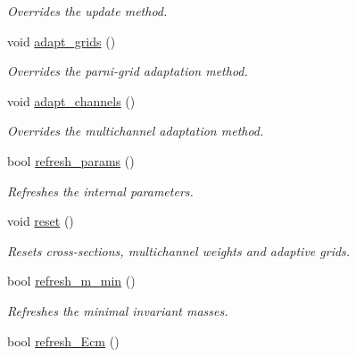 \begin{DoxyCompactItemize}
\begin{DoxyCompactList}\small\item\em Overrides the update method. \end{DoxyCompactList}\item 
\hypertarget{a00458_a5c06312d06862684d0ed0208c50c79ed}{}void \hyperlink{a00458_a5c06312d06862684d0ed0208c50c79ed}{adapt\+\_\+grids} ()\label{a00458_a5c06312d06862684d0ed0208c50c79ed}

\begin{DoxyCompactList}\small\item\em Overrides the parni-\/grid adaptation method. \end{DoxyCompactList}\item 
\hypertarget{a00458_ada36cad264a280d7a3e431ded70db380}{}void \hyperlink{a00458_ada36cad264a280d7a3e431ded70db380}{adapt\+\_\+channels} ()\label{a00458_ada36cad264a280d7a3e431ded70db380}

\begin{DoxyCompactList}\small\item\em Overrides the multichannel adaptation method. \end{DoxyCompactList}\item 
\hypertarget{a00458_a5705dfa7e9fafc6250aa4c9a46fa2817}{}bool \hyperlink{a00458_a5705dfa7e9fafc6250aa4c9a46fa2817}{refresh\+\_\+params} ()\label{a00458_a5705dfa7e9fafc6250aa4c9a46fa2817}

\begin{DoxyCompactList}\small\item\em Refreshes the internal parameters. \end{DoxyCompactList}\item 
\hypertarget{a00458_ae37d08f29d236504388d457aca77a63f}{}void \hyperlink{a00458_ae37d08f29d236504388d457aca77a63f}{reset} ()\label{a00458_ae37d08f29d236504388d457aca77a63f}

\begin{DoxyCompactList}\small\item\em Resets cross-\/sections, multichannel weights and adaptive grids. \end{DoxyCompactList}\item 
\hypertarget{a00458_a94de94ece36dbc8087f427ceb2f1846a}{}bool \hyperlink{a00458_a94de94ece36dbc8087f427ceb2f1846a}{refresh\+\_\+m\+\_\+min} ()\label{a00458_a94de94ece36dbc8087f427ceb2f1846a}

\begin{DoxyCompactList}\small\item\em Refreshes the minimal invariant masses. \end{DoxyCompactList}\item 
\hypertarget{a00458_af6da058dedb581f459056dd5a894441e}{}bool \hyperlink{a00458_af6da058dedb581f459056dd5a894441e}{refresh\+\_\+\+Ecm} ()\label{a00458_af6da058dedb581f459056dd5a894441e}


\end{DoxyCompactItemize}
